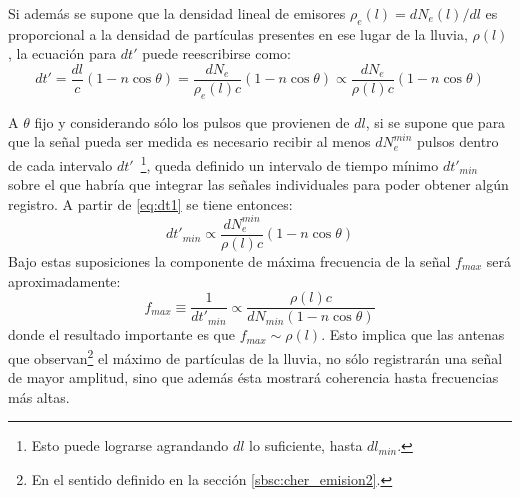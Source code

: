 	Si adem\'as se supone que la densidad lineal de emisores $\rho_e(l) = dN_e(l)/dl$ es proporcional a la densidad de part\'iculas presentes en ese lugar de la lluvia, $\rho(l)$, la ecuaci\'on para $dt'$ puede reescribirse como:
	\begin{equation}
	 dt' = \frac{dl}{c}(1-n\cos\theta) = \frac{dN_e}{\rho_e(l) c}(1-n\cos\theta)\propto \frac{dN_e}{\rho(l) c}(1-n\cos\theta)
	 \label{eq:dt1}
	\end{equation}
	

	A $\theta$ fijo y considerando s\'olo los pulsos que provienen de $dl$, si se supone que para que la se\~nal pueda ser medida es necesario recibir al menos $dN_e^{min}$ pulsos dentro de cada intervalo $dt'$~\footnote{Esto puede lograrse agrandando $dl$ lo suficiente, hasta $dl_{min}$.}, queda definido un intervalo de tiempo m\'inimo $dt'_{min}$ sobre el que habr\'ia que integrar las se\~nales individuales para poder obtener alg\'un registro. A partir de \ref{eq:dt1} se tiene entonces:
	\begin{equation}
	 dt'_{min} \propto \frac{dN_e^{min}}{\rho(l) c}(1-n\cos\theta)
	\end{equation}
	Bajo estas suposiciones la componente de m\'axima frecuencia de la se\~nal $f_{max}$  ser\'a aproximadamente:
	\begin{equation}
	 f_{max}\equiv \frac{1}{dt'_{min}} \propto \frac{\rho(l) c}{dN_{min}(1-n\cos\theta)}
	\end{equation}
	donde el resultado importante es que $f_{max}\sim\rho(l)$. 
	Esto implica que las antenas que observan\footnote{En el sentido definido en la secci\'on \ref{sbsc:cher_emision2}.} el m\'aximo de part\'iculas de la lluvia, no s\'olo registrar\'an una se\~nal de mayor amplitud, sino que adem\'as \'esta mostrar\'a coherencia hasta frecuencias m\'as altas.
	
